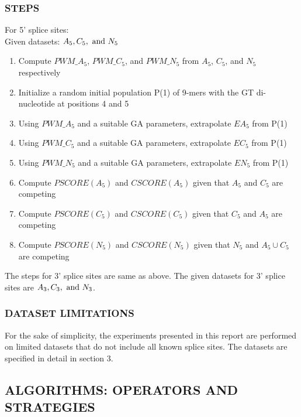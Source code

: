 \documentclass[12pt,a4paper]{article}
\begin{document}
	\subsubsection{STEPS} \label{sec:steps}
	For 5' splice sites:\\
	Given datasets: $A_5, C_5,\textnormal{ and }N_5$
	\begin{enumerate}
		\item Compute $PWM\_A_5$, $PWM\_C_5$, and $PWM\_N_5$ from $A_5$, $C_5$, and $N_5$ respectively
		\item Initialize a random initial population P(1) of 9-mers with the GT di-nucleotide at positions 4 and 5
		\item Using $PWM\_A_5$ and a suitable GA parameters, extrapolate $EA_5$ from P(1)
		\item Using $PWM\_C_5$ and a suitable GA parameters, extrapolate $EC_5$ from P(1)
		\item Using $PWM\_N_5$ and a suitable GA parameters, extrapolate $EN_5$ from P(1)
		\item Compute $PSCORE(A_5)$ and $CSCORE(A_5)$ given that $A_5$ and $C_5$ are competing
		\item Compute $PSCORE(C_5)$ and $CSCORE(C_5)$ given that $C_5$ and $A_5$ are competing
		\item Compute $PSCORE(N_5)$ and $CSCORE(N_5)$ given that $N_5$ and $A_5 \cup C_5$ are competing
	\end{enumerate}
	
	The steps for 3' splice sites are same as above. The given datasets for 3' splice sites are $A_3, C_3,\textnormal{ and }N_3$.
	
	\subsubsection{DATASET LIMITATIONS}
	For the sake of simplicity, the experiments presented in this report are performed on limited datasets that do not include all known splice sites. The datasets are specified in detail in section 3.
	
	\subsection{ALGORITHMS: OPERATORS AND STRATEGIES}
\end{document}
